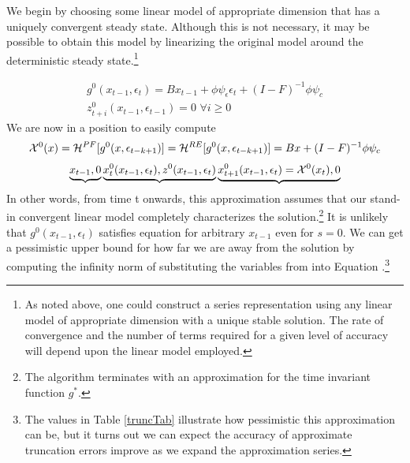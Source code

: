 \documentclass[12pt]{article}
\begin{document}
We begin by choosing some linear model of appropriate dimension that 
has a uniquely convergent steady state.  
Although this is not necessary, it may be possible to obtain this model by
linearizing the original model around the deterministic steady state.\footnote{As noted above, one could construct a series representation using any linear
 model of appropriate dimension with a unique stable solution.  The rate of convergence and the number of terms required for a  given level of accuracy will depend upon the linear model employed.}


 \begin{gather}
 g^0(x_{t-1},\epsilon_{t})=  
B x_{t-1}+ \phi \psi_\epsilon\epsilon_{t} +
 (I - F)^{-1} \phi \psi_c\\ \label{firstIter}
z^{0}_{t+i}(x_{t-1},\epsilon_{t-1})=0 \,\, \forall i \ge 0
 \end{gather}
We are now in a position to easily compute 
 \begin{gather}
\mathcal{X}^{0}(x)=\mathcal{H}^{PF}[g^{0}(x,\epsilon_{t-k+1})]=
\mathcal{H}^{RE}[g^{0}(x,\epsilon_{t-k+1})]= 
B x+  (I - F)^{-1} \phi \psi_c
 \end{gather}
\begin{gather}
\underbrace{x_{t-1},0} 
\underbrace{x^{0}_t(x_{t-1},\epsilon_t),z^{0}(x_{t-1},\epsilon_t)}
\underbrace{x^{0}_{t+1}(x_{t-1},\epsilon_t)=\mathcal{X}^{0}(x_{t}),0}
\end{gather}
In other words, from time t onwards, this approximation assumes 
that our stand-in
 convergent linear model completely characterizes the solution.\footnote{
The algorithm terminates with an approximation for 
the time invariant function $g^\ast$.}  It is unlikely that $g^0(x_{t-1},\epsilon_{t})$
satisfies equation  for arbitrary $x_{t-1}$ even for $s=0$.
We can get a pessimistic upper bound for how far we are away from the solution 
by computing the infinity norm of substituting the variables from into Equation .\footnote{The values in Table \ref{truncTab} illustrate how
pessimistic this approximation can be, but it turns out we can expect the accuracy of  approximate truncation errors improve as we expand the approximation series.}
\end{document}
